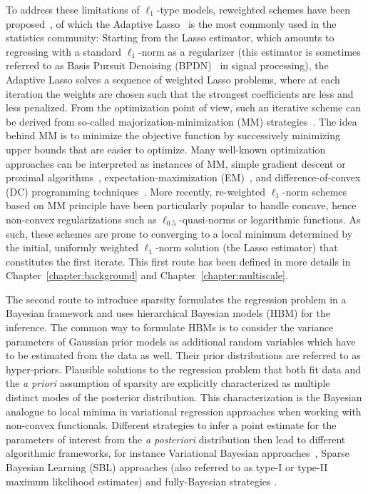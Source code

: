 To address these limitations of $\ell_1$-type models, reweighted schemes have been proposed~\cite{Candes,Gasso,Rakotomamonjy,zhang-rao:2011,strohmeier-etal:16}, of which the Adaptive Lasso~\cite{Zou06} is the most commonly used in the statistics community: Starting from the Lasso estimator, which amounts to regressing with a standard $\ell_1$-norm as a regularizer (this estimator is sometimes referred to as Basis Pursuit Denoising (BPDN)~\cite{Chen_Donoho_Saunders98} in signal processing), the Adaptive Lasso solves a sequence of weighted Lasso problems, where at each iteration the weights are chosen such that the strongest coefficients are less and less penalized.
From the optimization point of view, such an iterative scheme can be derived from so-called majorization-minimization (MM) strategies~\cite{lange2000optimization,schifano2010majorization}.
The idea behind MM is to minimize the objective function by successively minimizing upper bounds that are easier to optimize. Many well-known optimization approaches can be interpreted as instances of MM, \eg simple gradient descent or proximal algorithms~\cite{Combettes2011}, expectation-maximization (EM)~\cite{Dempster77maximumlikelihood}, and difference-of-convex (DC) programming techniques~\cite{Horst:1999}.
%
More recently, re-weighted $\ell_1$-norm schemes based on MM principle have been particularly popular to handle concave, hence non-convex regularizations such as $\ell_{0.5}$-quasi-norms or logarithmic functions. As such, these schemes are prone to converging to a local minimum determined by the initial, uniformly weighted $\ell_1$-norm solution (\ie the Lasso estimator) that constitutes the first iterate. This first route has been defined in more details in Chapter~\ref{chapter:background} and Chapter~\ref{chapter:multiscale}.

The second route to introduce sparsity formulates the regression problem in a Bayesian framework and uses hierarchical Bayesian models (HBM) \cite{mackay2003information} for the inference.
The common way to formulate HBMs is to consider the variance parameters of Gaussian prior models as additional random variables which have to be estimated from the data as well. Their prior distributions are referred to as hyper-priors. Plausible solutions to the regression problem that both fit data and the \emph{a priori} assumption of sparsity are explicitly characterized as multiple distinct modes of the posterior distribution. This characterization is the Bayesian analogue to local minima in variational regression approaches when working with non-convex functionals. Different strategies to infer a point estimate for the parameters of interest from the \emph{a posteriori} distribution then lead to different algorithmic frameworks, for instance Variational Bayesian approaches~\cite{mackay2003information,jordan1999introduction,sato2004hierarchical,FrHaDaKiPhTrHeFlMa08,shervashidze2015learning}, Sparse Bayesian Learning (SBL) approaches (also referred to as type-I or type-II maximum likelihood estimates) \cite{tipping2001sparse,wipf2004sparse,Wipf-Nagarajan:2009,zhang-rao:2011} and fully-Bayesian strategies \cite{CaHaPuSo09,Lucka-etal:2012}.

